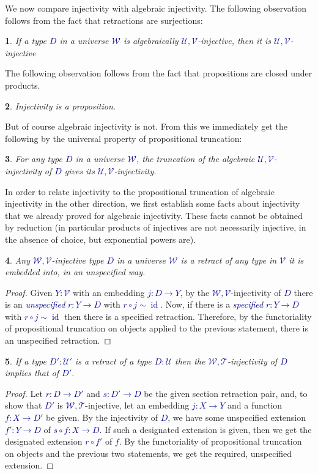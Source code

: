 \documentclass[10pt]{article}
\newcommand{\db}{\textcolor{darkblue}}
\newcommand{\df}[1]{\emph{\db{#1}}}
\newcommand{\m}[1]{\db{$#1$}}
\newcommand{\id}{\operatorname{id}}
\newcommand{\comp}{\mathrel{\circ}}
\newcommand{\U}{\mathcal{U}}
\newcommand{\V}{\mathcal{V}}
\newcommand{\W}{\mathcal{W}}
\newcommand{\T}{\mathcal{T}}
\newtheorem{numbered}{}
\theoremstyle{definition}
\begin{document}
We now compare injectivity with algebraic injectivity. The following observation follows from the fact that retractions are surjections:
\begin{numbered}
  If a type \m{D} in a universe \m{\W} is algebraically
  \m{\U,\V}-injective, then it is \m{\U,\V}-injective
\end{numbered}
\noindent The following observation follows from the fact that propositions are
closed under products.
\begin{numbered}
  Injectivity is a proposition.
\end{numbered}
\noindent But of course algebraic injectivity is not. From this we immediately
get the following by the universal property of propositional
truncation:

\begin{numbered}
  For any type \m{D} in a universe \m{\W}, the truncation of the
  algebraic \m{\U,\V}-injectivity of \m{D} gives its
  \m{\U,\V}-injectivity.
\end{numbered}

In order to relate injectivity to the propositional truncation of
algebraic injectivity in the other direction, we first establish some
facts about injectivity that we already proved for algebraic
injectivity. These facts cannot be obtained by reduction (in
particular products of injectives are not necessarily injective, in
the absence of choice, but exponential powers are).

\begin{numbered} \label{embedding-||retract||}
  Any \m{\W,\V}-injective type \m{D} in a universe \m{\W} is a retract
  of any type in \m{\V} it is embedded into, in an unspecified way.
\end{numbered}
\begin{proof}
  Given \m{Y:\V} with an embedding \m{j : D \to Y}, by the
  \m{\W,\V}-injectivity of \m{D} there is an \df{unspecified} \m{r : Y
    \to D} with \m{r \comp j \sim \id}. Now, if there is a
  \df{specified} \m{r : Y \to D} with \m{r \comp j \sim \id} then
  there is a specified retraction. Therefore, by the functoriality of
  propositional truncation on objects applied to the previous
  statement, there is an unspecified retraction.
\end{proof}

\begin{numbered}
  If a type \m{D' : \U'} is a retract of a type \m{D : \U} then the \m{\W,\T}-injectivity of
  \m{D} implies that of \m{D'}.
\end{numbered}
\begin{proof}
  Let \m{r : D \to D'} and \m{s : D' \to D} be the given section
  retraction pair, and, to show that \m{D'} is \m{\W,\T}-injective,
  let an embedding \m{j : X \to Y} and a function \m{f : X \to D'} be
  given. By the injectivity of \m{D}, we have some unspecified
  extension \m{f' : Y \to D} of \m{s \comp f : X \to D}.  If such a
  designated extension is given, then we get the designated extension
  \m{r \comp f'} of \m{f}. By the functoriality of propositional
  truncation on objects and the previous two statements, we get the
  required, unspecified extension.
\end{proof}
\end{document}
